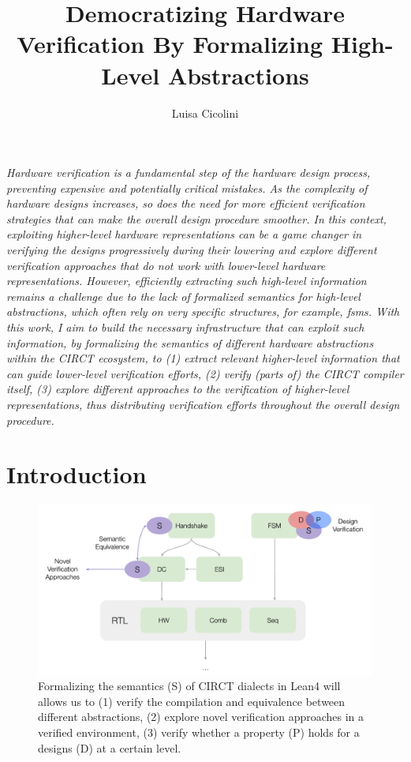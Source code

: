 \documentclass[sigconf,authorversion,nonacm, 11pt]{acmart}
\begin{document}
\title{Democratizing Hardware Verification By Formalizing High-Level Abstractions}

\author{Luisa Cicolini}

\maketitle
\thispagestyle{empty}

\textit{
    Hardware verification is a fundamental step of the hardware design process, preventing expensive and potentially critical 
    mistakes.
    As the complexity of hardware designs increases, so does the need for more efficient verification strategies that can 
    make the overall design procedure smoother. %
    In this context, exploiting higher-level hardware representations can be a game changer in verifying the designs 
    progressively during their lowering and explore different verification approaches that do not work with 
    lower-level hardware representations. %
    However, efficiently extracting such high-level information remains a challenge due to the lack of formalized semantics  
    for high-level abstractions, which often rely on very specific structures, for example, \acp{fsm}.
    With this work, I aim to build the necessary infrastructure that can exploit such information,
    by formalizing the semantics of different hardware abstractions within the CIRCT ecosystem, to 
    (1) extract relevant higher-level information that can guide lower-level verification efforts, 
    (2) verify (parts of) the CIRCT compiler itself, %
    (3) explore different approaches to the verification of higher-level representations, thus distributing verification 
    efforts throughout the overall design procedure. 
}


\section{Introduction}

\begin{figure}[ht]
    \includegraphics[scale=0.8]{semantics.pdf}
    \caption{Formalizing the semantics (S) of CIRCT dialects in Lean4 will allows us to (1) verify the compilation and equivalence 
    between different abstractions, (2) explore novel verification approaches in a verified environment, (3) verify whether a property 
    (P) holds for a designs (D) at a certain level.}
\end{figure}
\end{document}

